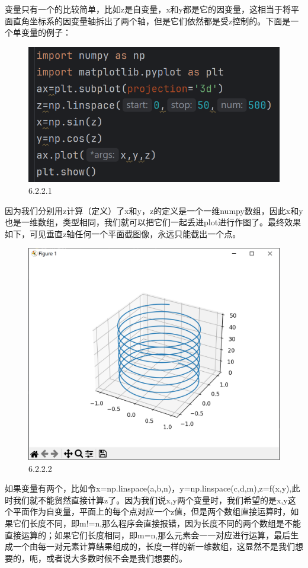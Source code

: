 \documentclass[12pt]{article}
\begin{document}
变量只有一个的比较简单，比如z是自变量，x和y都是它的因变量，这相当于将平面直角坐标系的因变量轴拆出了两个轴，但是它们依然都是受z控制的。下面是一个单变量的例子：
\begin{figure}[H]
    \centering
    \includegraphics[width=0.5\linewidth]{3D mesh program1.png}
    \caption{6.2.2.1}
    \label{fig:enter-label}
\end{figure}
因为我们分别用z计算（定义）了x和y，z的定义是一个一维numpy数组，因此x和y也是一维数组，类型相同，我们就可以把它们一起丢进plot进行作图了。最终效果如下，可见垂直z轴任何一个平面截图像，永远只能截出一个点。
\begin{figure}[H]
    \centering
    \includegraphics[width=0.5\linewidth]{3D mesh Pic1.png}
    \caption{6.2.2.2}
    \label{fig:enter-label}
\end{figure}
如果变量有两个，比如令x=np.linspace(a,b,n)，y=np.linspace(c,d,m),z=f(x,y),此时我们就不能贸然直接计算z了。因为我们说x,y两个变量时，我们希望的是x,y这个平面作为自变量，平面上的每个点对应一个z值，但是两个数组直接运算时，如果它们长度不同，即m!=n,那么程序会直接报错，因为长度不同的两个数组是不能直接运算的；如果它们长度相同，即m=n,那么元素会一一对应进行运算，最后生成一个由每一对元素计算结果组成的，长度一样的新一维数组，这显然不是我们想要的，呃，或者说大多数时候不会是我们想要的。
\end{document}

